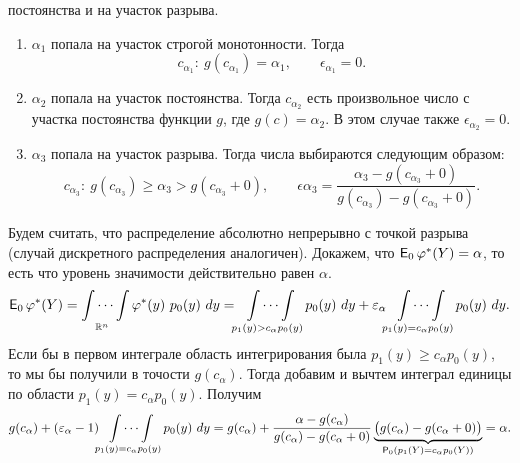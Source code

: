 постоянства и на участок разрыва.
\begin{center}
\end{center}

\begin{enumerate}
    \item $\alpha_1$ попала на участок строгой монотонности. Тогда
        \[
            c_{\alpha_1}:\ g(c_{\alpha_1}) = \alpha_1,
            \qquad \epsilon_{\alpha_1} = 0.
            \]
    \item $\alpha_2$ попала на участок постоянства. Тогда
        $c_{\alpha_2}$ есть произвольное число с участка постоянства
        функции $g$, где $g(c) = \alpha_2$. В этом случае также
        $\epsilon_{\alpha_2} = 0$.
    \item $\alpha_3$ попала на участок разрыва. Тогда числа выбираются
        следующим образом:
        \[
            c_{\alpha_3}:\ g(c_{\alpha_3}) \geqslant \alpha_3 >
            g(c_{\alpha_3} + 0), \qquad \epsilon{\alpha_3} =
            \frac{\alpha_3 - g(c_{\alpha_3}+0)}{g(c_{\alpha_3}) - 
            g(c_{\alpha_3}+0)}.
            \]
\end{enumerate}

Будем считать, что распределение абсолютно непрерывно с точкой
разрыва (случай дискретного распределения аналогичен). Докажем, что
$\E_0 \phi^*(Y) = \alpha$, то есть что уровень значимости
действительно равен $\alpha$.
\[
    \E_0 \phi^*(Y) = \idotsint\limits_{\R^n} \phi^*(y)\ p_0(y)\ dy =
    \idotsint\limits_{p_1(y) > c_\alpha p_0(y)} p_0(y)\ dy +
    \epsilon_\alpha\idotsint\limits_{p_1(y) = c_\alpha p_0(y)} 
    p_0(y)\ dy.
    \]
Если бы в первом интеграле область интегрирования была $p_1(y)
\geqslant c_\alpha p_0(y)$, то мы бы получили в точости $g(c_\alpha)$.
Тогда добавим и вычтем интеграл единицы по области $p_1(y) = c_\alpha
p_0(y)$. Получим
\[
    g(c_\alpha) + (\epsilon_\alpha - 1)
    \idotsint\limits_{p_1(y) = c_\alpha p_0(y)} p_0(y)\ dy = 
    g(c_\alpha) + \frac{\alpha - g(c_\alpha)}{g(c_\alpha) -
    g(c_\alpha + 0)}\underbrace{\big( g(c_\alpha) - g(c_\alpha + 0)
    \big)}_{\Pr_0(p_1(Y) = c_\alpha p_0(Y))} = \alpha.
    \]

